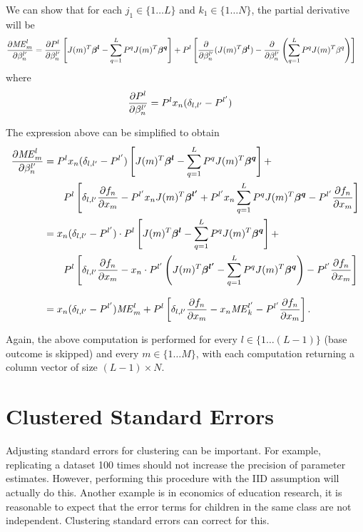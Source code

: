 We can show that for each $j_1 \in \{ 1 \ldots L \}$ and $k_1 \in \{1 \ldots N\}$,
the partial derivative will be
\begin{align*}
  \pder[\mathit{ME}_m^l]{\beta_n^{l'}} &=
        \pder[P^l]{\beta_n^{l'}}
            \left[ J(m)^T \vec{\beta^l} -
                   \sum_{q=1}^{L} P^q J(m)^T \vec{\beta^q}
            \right] +
        P^l \left[ \pder[]{\beta_n^{l'}}(J(m)^T \vec{\beta^l}) -
                   \pder[]{\beta_n^{l'}} \left( \sum_{q=1}^{L} P^q J(m)^T \beta^q \right)
            \right]
\end{align*}
where
\begin{align*}
  \pder[P^l]{\beta_n^{l'}} &= P^l x_n (\delta_{l,l'} - P^{l'})
\end{align*}

The expression above can be simplified to obtain
\begin{align*}
  \pder[\mathit{ME}_m^l]{\beta_n^{l'}} &=
        P^l x_n (\delta_{l,l'} - P^{l'})
            \left[ J(m)^T \vec{\beta^l} -
                   \sum_{q=1}^{L} P^q J(m)^T \vec{\beta^q}
            \right] + \\
            & \qquad P^l \left[ \delta_{l,l'} \pder[f_n]{x_m} - P^{l'} x_n J(m)^T \vec{\beta^{l'}} +
                       P^{l'} x_n \sum_{q=1}^{L} P^q J(m)^T \vec{\beta^q} -
                       P^{l'} \pder[f_n]{x_m}
                \right] \\
        &= x_n (\delta_{l,l'} - P^{l'}) \cdot P^l \left[J(m)^T\vec{\beta^l} -
                   \sum_{q=1}^{L} P^q J(m)^T \vec{\beta^q} \right] + \\
            & \qquad  P^l \left[\delta_{l,l'} \pder[f_n]{x_m} -
                                x_n \cdot P^{l'}
                                \left( J(m)^T \vec{\beta^{l'}} - \sum_{q=1}^{L} P^q J(m)^T \vec{\beta^q} \right)
                                - P^{l'} \pder[f_n]{x_m}
                        \right] \\[7pt]
        &= x_n (\delta_{l, l'} - P^{l'})\mathit{ME}_m^l +
            P^l \left[ \delta_{l, l'} \pder[f_n]{x_m} - x_n \mathit{ME}_k^{l'} - P^{l'} \pder[f_n]{x_m} \right].
\end{align*}

Again, the above computation is performed for every $l \in \{1 \ldots (L-1)\}$ (base outcome is skipped)
and every $m \in \{1 \ldots M\}$, with each computation returning a column vector
of size $(L-1) \times N$.


\section{Clustered Standard Errors} %
\label{sec:clustered_standard_errors}
Adjusting standard errors for clustering can be important. For
example, replicating a dataset 100 times should not increase the
precision of parameter estimates. However, performing this procedure
with the IID assumption will actually do this. Another example is in
economics of education research, it is reasonable to expect that the
error terms for children in the same class are not
independent. Clustering standard errors can correct for this.

